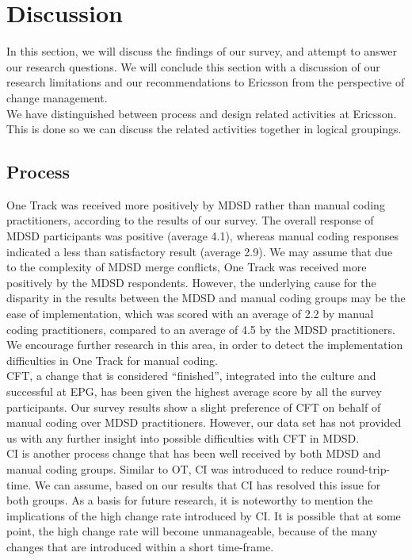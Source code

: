 \documentclass[final_report_innit.tex]{subfiles}
\begin{document}
\section{Discussion}

In this section, we will discuss the findings of our survey, and attempt to answer our research questions. We will conclude this section with a discussion of our research limitations and our recommendations to Ericsson from the perspective of change management. 
\\

We have distinguished between process and design related activities at Ericsson. This is done so we can discuss the related activities together in logical groupings.

\subsection{Process}

One Track was received more positively by MDSD rather than manual coding practitioners, according to the results of our survey. The overall response of MDSD participants was positive (average 4.1), whereas manual coding responses indicated a less than satisfactory result (average 2.9). We may assume that due to the complexity of MDSD merge conflicts, One Track was received more positively by the MDSD respondents. However, the underlying cause for the disparity in the results between the MDSD and manual coding groups may be the ease of implementation, which was scored with an average of 2.2 by manual coding practitioners, compared to an average of 4.5 by the MDSD practitioners. We encourage further research in this area, in order to detect the implementation difficulties in One Track for manual coding.
\\

CFT, a change that is considered ``finished'', integrated into the culture and successful at EPG, has been given the highest average score by all the survey participants. Our survey results show a slight preference of CFT on behalf of manual coding over MDSD practitioners. However, our data set has not provided us with any further insight into possible difficulties with CFT in MDSD. 
\\

CI is another process change that has been well received by both MDSD and manual coding groups. Similar to OT, CI was introduced to reduce round-trip-time. We can assume, based on our results that CI has resolved this issue for both groups. As a basis for future research, it is noteworthy to mention the implications of the high change rate introduced by CI. It is possible that at some point, the high change rate will become unmanageable, because of the many changes that are introduced within a short time-frame.
\\
\end{document}
